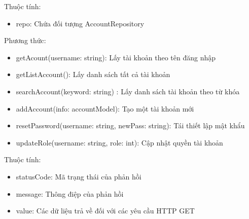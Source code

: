 Thuộc tính:
\begin{itemize}
	\item repo: Chứa đối tượng AccountRepository
\end{itemize}
Phương thức:
\begin{itemize}
	\item getAcount(username: string): Lấy tài khoản theo tên đăng nhập
	\item getListAccount(): Lấy danh sách tất cả tài khoản
	\item searchAccount(keyword: string) : Lấy danh sách tài khoản theo từ khóa
	\item addAccount(info: accountModel): Tạo một tài khoản mới
	\item resetPassword(username: string, newPass: string): Tái thiết lập mật khẩu
	\item updateRole(username: string, role: int): Cập nhật quyền tài khoản
\end{itemize}


Thuộc tính:
\begin{itemize}
	\item statusCode: Mã trạng thái của phản hồi
	\item message: Thông điệp của phản hồi
	\item value: Các dữ liệu trả về đối với các yêu cầu HTTP GET
\end{itemize}

\newpage


